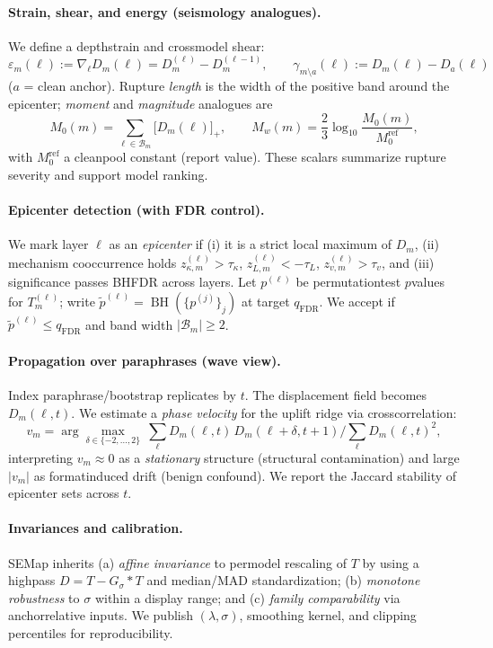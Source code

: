 \documentclass[11pt]{article}
\begin{document}
\paragraph{Strain, shear, and energy (seismology analogues).}
We define a depth\textendash strain and cross\textendash model shear:
\[
\varepsilon_m(\ell):=\nabla_\ell D_m(\ell)=D_m^{(\ell)}-D_m^{(\ell-1)},\qquad
\gamma_{m\!\setminus\!a}(\ell):=D_m(\ell)-D_a(\ell)
\]
($a$ = clean anchor). Rupture \emph{length} is the width of the positive band around the epicenter; \emph{moment} and \emph{magnitude} analogues are
\[
M_0(m)=\sum_{\ell\in\mathcal{B}_m} \big[D_m(\ell)\big]_+,\qquad
M_w(m)=\frac{2}{3}\log_{10}\!\frac{M_0(m)}{M_0^{\mathrm{ref}}},
\]
with $M_0^{\mathrm{ref}}$ a clean\textendash pool constant (report value). These scalars summarize rupture severity and support model ranking.

\paragraph{Epicenter detection (with FDR control).}
We mark layer $\ell$ as an \emph{epicenter} if (i) it is a strict local maximum of $D_m$, (ii) mechanism co\textendash occurrence holds
$z_{\kappa,m}^{(\ell)}>\tau_\kappa$, $z_{L,m}^{(\ell)}<-\tau_L$, $z_{v,m}^{(\ell)}>\tau_v$, and (iii) significance passes BH\textendash FDR across layers.
Let $p^{(\ell)}$ be permutation\textendash test $p$\textendash values for $T_m^{(\ell)}$; write $\tilde p^{(\ell)}=\operatorname{BH}(\{p^{(j)}\}_j)$ at target $q_{\mathrm{FDR}}$.
We accept if $\tilde p^{(\ell)}\le q_{\mathrm{FDR}}$ and band width $|\mathcal{B}_m|\ge2$.

\paragraph{Propagation over paraphrases (wave view).}
Index paraphrase/bootstrap replicates by $t$. The displacement field becomes $D_m(\ell,t)$. We estimate a \emph{phase velocity} for the uplift ridge via cross\textendash correlation:
\[
v_m=\arg\max_{\delta\in\{-2,\ldots,2\}}\ \sum_{\ell} D_m(\ell,t)\,D_m(\ell+\delta,t{+}1)\Big/\!\sum_{\ell} D_m(\ell,t)^2,
\]
interpreting $v_m\!\approx\!0$ as a \emph{stationary} structure (structural contamination) and large $|v_m|$ as format\textendash induced drift (benign confound). We report the Jaccard stability of epicenter sets across $t$.

\paragraph{Invariances and calibration.}
SE\textendash Map inherits (a) \emph{affine invariance} to per\textendash model rescaling of $T$ by using a high\textendash pass $D=T-G_\sigma*T$ and median/MAD standardization; (b) \emph{monotone robustness} to $\sigma$ within a display range; and (c) \emph{family comparability} via anchor\textendash relative inputs. We publish $(\lambda,\sigma)$, smoothing kernel, and clipping percentiles for reproducibility.
\end{document}
